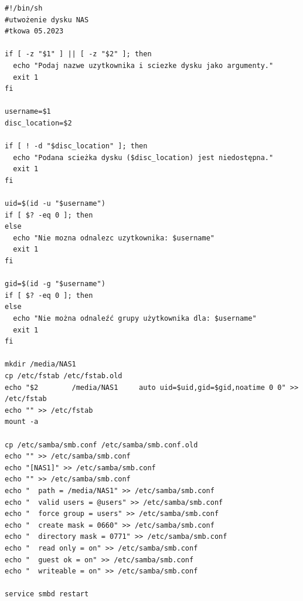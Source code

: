 \documentclass{article}
\begin{document}
\begin{lstlisting}[caption={skrypt konfiguracyjny NAS: \textit{nas1\_config.sh}}]
#!/bin/sh
#utwożenie dysku NAS
#tkowa 05.2023

if [ -z "$1" ] || [ -z "$2" ]; then
  echo "Podaj nazwe uzytkownika i sciezke dysku jako argumenty."
  exit 1
fi

username=$1
disc_location=$2

if [ ! -d "$disc_location" ]; then
  echo "Podana scieżka dysku ($disc_location) jest niedostępna."
  exit 1
fi

uid=$(id -u "$username")
if [ $? -eq 0 ]; then
else
  echo "Nie mozna odnalezc uzytkownika: $username"
  exit 1
fi

gid=$(id -g "$username")
if [ $? -eq 0 ]; then
else
  echo "Nie można odnaleźć grupy użytkownika dla: $username"
  exit 1
fi

mkdir /media/NAS1
cp /etc/fstab /etc/fstab.old
echo "$2        /media/NAS1     auto uid=$uid,gid=$gid,noatime 0 0" >> /etc/fstab
echo "" >> /etc/fstab
mount -a

cp /etc/samba/smb.conf /etc/samba/smb.conf.old
echo "" >> /etc/samba/smb.conf
echo "[NAS1]" >> /etc/samba/smb.conf
echo "" >> /etc/samba/smb.conf
echo "  path = /media/NAS1" >> /etc/samba/smb.conf
echo "  valid users = @users" >> /etc/samba/smb.conf
echo "  force group = users" >> /etc/samba/smb.conf
echo "  create mask = 0660" >> /etc/samba/smb.conf
echo "  directory mask = 0771" >> /etc/samba/smb.conf
echo "  read only = on" >> /etc/samba/smb.conf
echo "  guest ok = on" >> /etc/samba/smb.conf
echo "  writeable = on" >> /etc/samba/smb.conf

service smbd restart
\end{lstlisting}
\clearpage
\end{document}

